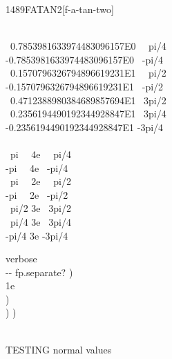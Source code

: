 \begin{worddef}{1489}{FATAN2}[f-a-tan-two]
\begin{testing}
		 \word[tools]{[IF]} \\
		\tab ~0.7853981633974483096157E0  ~~pi/4 \\
		\tab -0.7853981633974483096157E0  ~-pi/4 \\
		\tab ~0.1570796326794896619231E1  ~~pi/2 \\
		\tab -0.1570796326794896619231E1  ~-pi/2 \\
		\tab ~0.4712388980384689857694E1  ~3pi/2 \\
		\tab ~0.2356194490192344928847E1  ~3pi/4 \\
		\tab -0.2356194490192344928847E1  -3pi/4 \\
		\word[tools]{[ELSE]} \\
		\tab ~pi~~ 4e   ~~pi/4 \\
		\tab -pi~~ 4e   ~-pi/4 \\
		\tab ~pi~~ 2e   ~~pi/2 \\
		\tab -pi~~ 2e   ~-pi/2 \\
		\tab ~pi/2 3e   ~3pi/2 \\
		\tab ~pi/4 3e   ~3pi/4 \\
		\tab -pi/4 3e   -3pi/4 \\
		\word[tools]{[THEN]}

		verbose  \word[tools]{[IF]} \\
		\tab {}  -{}- fp.separate? ) \\
		\tab[2]   1e     \word{=} \word{;}  \\
		\tab {}   ) \\
		\tab \word[tools]{[IF]}   ) \word[tools]{[ELSE]}   ) \word[tools]{[THEN]} \\
		\tab {} \\
		\word[tools]{[THEN]}

		TESTING normal values


\end{testing}
\end{worddef}
